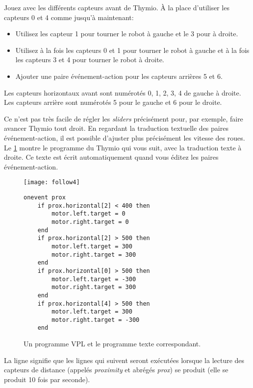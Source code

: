 {
Jouez avec les différents capteurs avant de Thymio.
À la place d'utiliser les capteurs 0 et 4 comme jusqu'à maintenant:
\begin{itemize}[noitemsep,nosep,leftmargin=*]
\item Utilisez les capteur 1 pour tourner le robot à gauche et le 3 pour à droite.
\item Utilisez à la fois les capteurs 0 et 1 pour tourner le robot à gauche et à la fois les capteurs 3 et 4 pour tourner le robot à droite.
\item Ajouter une paire événement-action pour les capteurs arrières 5 et 6.
\end{itemize}
{\small Les capteurs horizontaux avant sont numérotés 0, 1, 2, 3, 4 de gauche à droite.
Les capteurs arrière sont numérotés 5 pour le gauche et 6 pour le droite.}
}


Ce n'est pas très facile de régler les \textit{sliders} précisément pour, par exemple, faire avancer Thymio tout droit.
En regardant la traduction textuelle des paires événement-action, il est possible d'ajuster plus précisément les vitesse des roues.
Le \cref{fig.textcode} montre le programme du Thymio qui vous suit, avec la traduction texte à droite.
Ce texte est écrit automatiquement quand vous éditez les paires événement-action.

\begin{figure}
\texttt{[image: follow4]}
\hfill
\begin{minipage}[b]{0.6\textwidth}
\footnotesize
\begin{lstlisting}
onevent prox
	if prox.horizontal[2] < 400 then
		motor.left.target = 0
		motor.right.target = 0
	end
	if prox.horizontal[2] > 500 then
		motor.left.target = 300
		motor.right.target = 300
	end
	if prox.horizontal[0] > 500 then
		motor.left.target = -300
		motor.right.target = 300
	end
	if prox.horizontal[4] > 500 then
		motor.left.target = 300
		motor.right.target = -300
	end
\end{lstlisting}
\end{minipage}
\caption{Un programme VPL et le programme texte correspondant.}
\label{fig.textcode}
\end{figure}

La ligne  signifie que les lignes qui suivent seront exécutées lorsque la lecture des capteurs de distance (appelés \textit{proximity} et abrégés \textit{prox}) se produit (elle se produit 10 fois par seconde).


